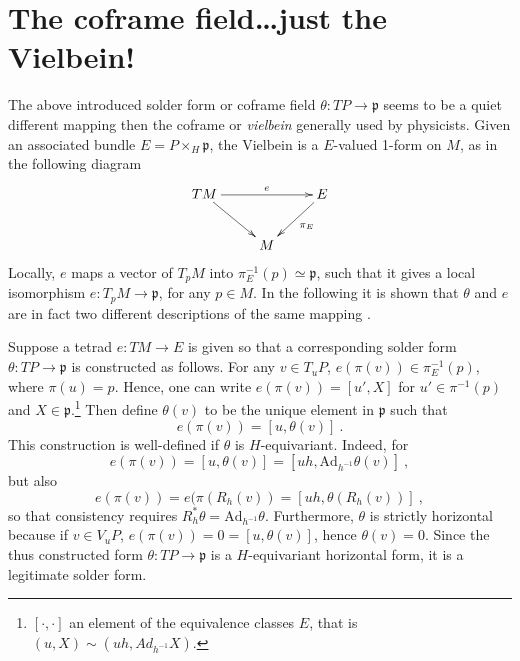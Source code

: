 \documentclass[11pt]{article}
\begin{document}
\section{The coframe field\dots just the Vielbein!}

{
}

The above introduced solder form or coframe field $\theta : TP 
\to \mathfrak{p}$ seems to be a quiet different mapping then the 
coframe or \emph{vielbein} generally used by physicists. Given an 
associated bundle $E = P \times_H \mathfrak{p}$, the Vielbein is 
a $E$-valued 1-form on $M$, as in the following diagram
%
\begin{displaymath}
	\xymatrix{
		TM
			\ar[rr]^-{e}
			\ar[dr]
		& & E
			\ar[dl]^-{\pi_E}
		\\
		& M &
	}
\end{displaymath}
Locally, $e$ maps a vector of $T_pM$ into $\pi^{-1}_E(p) \simeq
\mathfrak{p}$, such that it gives a local isomorphism $e : T_pM 
\to \mathfrak{p}$, for any $p \in M$. In the following it is 
shown that $\theta$ and $e$ are in fact two different 
descriptions of the same mapping \cite{Wise:2010sm}.

Suppose a tetrad $e:TM \to E$ is given so that a corresponding 
solder form $\theta:TP \to \mathfrak{p}$ is constructed as 
follows.  For any $v \in T_uP$, $e(\pi(v)) \in \pi^{-1}_E(p)$, 
where $\pi(u) = p$.  Hence, one can write $e(\pi(v)) = [u',X]$ 
for $u' \in \pi^{-1}(p)$ and $X \in 
\mathfrak{p}$.\footnote{$[\cdot,\cdot]$ an element of the 
	equivalence classes $E$, that is $(u,X) \sim 
	(uh,Ad_{h^{-1}}X)$.} Then define $\theta(v)$ to be the unique 
element in $\mathfrak{p}$ such that
%
\begin{displaymath}
	e(\pi(v)) = [u,\theta(v)]~.
\end{displaymath}
This construction is well-defined if $\theta$ is $H$-equivariant.  
Indeed, for
%
\begin{displaymath}
	e(\pi(v)) = [u,\theta(v)] = [uh,\mathrm{Ad}_{h^{-1}} 
	\theta(v)]~,
\end{displaymath}
but also
\begin{displaymath}
	e(\pi(v)) = e(\pi(R_h(v)) = [uh,\theta(R_h(v))]~,
\end{displaymath}
so that consistency requires $R^\ast_h \theta = 
\mathrm{Ad}_{h^{-1}} \theta$. Furthermore, $\theta$ is strictly 
horizontal because if $v \in V_uP$, $e(\pi(v)) = 0 = 
[u,\theta(v)]$, hence $\theta(v) = 0$. Since the thus constructed 
form $\theta: TP \to \mathfrak{p}$ is a $H$-equivariant 
horizontal form, it is a legitimate solder form.
\end{document}

